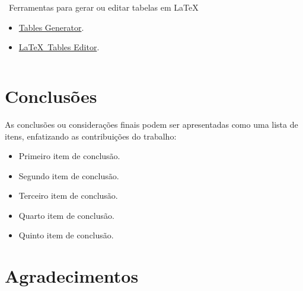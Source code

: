 \documentclass[%
  aspectratio = 169,%
  10pt,%
  t,%
  onlytextwidth,%
  compress,%
  handout,%
  xcolor = table,%
  english,%
  brazilian,%
]{beamer}
\begin{document}
\begin{frame}
\begin{columns}[t]
\begin{alertblock}{\faInfoCircle\ Ferramentas para gerar ou editar tabelas em \LaTeX}

\begin{itemize}
\item[\tiny\faTools] \href{https://www.tablesgenerator.com/}{Tables Generator\LinkIcon}.
\item[\tiny\faTools] \href{https://www.latex-tables.com/}{\LaTeX\ Tables Editor\LinkIcon}.
\end{itemize}

\end{alertblock}

\end{columns}

\end{frame}

\section{Conclusões}%
\label{sect:concl}

\begin{frame}

As conclusões ou considerações finais podem ser apresentadas como uma lista de itens, enfatizando as contribuições do trabalho:

\begin{itemize}
\item Primeiro item de conclusão.
\item Segundo item de conclusão.
\item Terceiro item de conclusão.
\item Quarto item de conclusão.
\item Quinto item de conclusão.
\end{itemize}

\end{frame}

\section<presentation>{\refname}%
\label<presentation>{sect:ref}


\section{Agradecimentos}%
\label{sect:ack}
\end{document}

